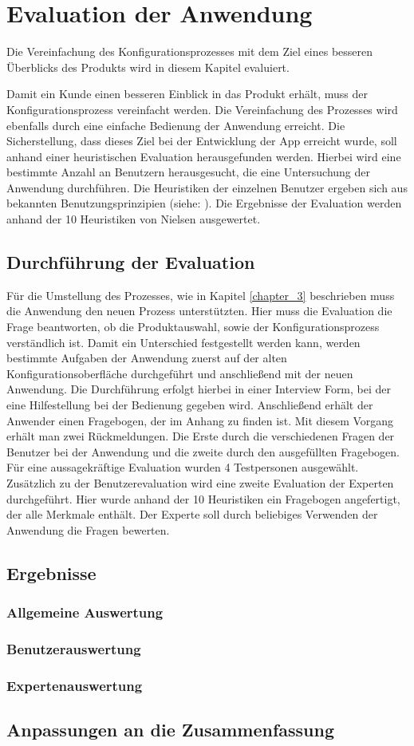 \chapter{Evaluation der Anwendung}\label{chapter_6}
Die Vereinfachung des Konfigurationsprozesses mit dem Ziel eines besseren Überblicks des Produkts wird in diesem Kapitel evaluiert. 


Damit ein Kunde einen besseren Einblick in das Produkt erhält, muss der Konfigurationsprozess vereinfacht werden. Die Vereinfachung des Prozesses wird ebenfalls durch eine einfache Bedienung der Anwendung erreicht. Die Sicherstellung, dass dieses Ziel bei der Entwicklung der App erreicht wurde, soll anhand einer heuristischen Evaluation herausgefunden werden. Hierbei wird eine bestimmte Anzahl an Benutzern herausgesucht, die eine Untersuchung der Anwendung durchführen. Die Heuristiken der einzelnen Benutzer ergeben sich aus bekannten Benutzungsprinzipien (siehe: \cite{bib:heuristik1}). Die Ergebnisse der Evaluation werden anhand der 10 Heuristiken von Nielsen \cite{bib:heuristik2} ausgewertet.


\section{Durchführung der Evaluation}
Für die Umstellung des Prozesses, wie in Kapitel \ref{chapter_3} beschrieben muss die Anwendung den neuen Prozess unterstützten. Hier muss die Evaluation die Frage beantworten, ob die Produktauswahl, sowie der Konfigurationsprozess verständlich ist. Damit ein Unterschied festgestellt werden kann, werden bestimmte Aufgaben der Anwendung zuerst auf der alten Konfigurationsoberfläche durchgeführt und anschließend mit der neuen Anwendung. Die Durchführung erfolgt hierbei in einer Interview Form, bei der eine Hilfestellung bei der Bedienung gegeben wird. Anschließend erhält der Anwender einen Fragebogen, der im Anhang zu finden ist. Mit diesem Vorgang erhält man zwei Rückmeldungen. Die Erste durch die verschiedenen Fragen der Benutzer bei der Anwendung und die zweite durch den ausgefüllten Fragebogen. Für eine aussagekräftige Evaluation wurden 4 Testpersonen ausgewählt. Zusätzlich zu der Benutzerevaluation wird eine zweite Evaluation der Experten durchgeführt. Hier wurde anhand der 10 Heuristiken ein Fragebogen angefertigt, der alle Merkmale enthält. Der Experte soll durch beliebiges Verwenden der Anwendung die Fragen bewerten. 


\section{Ergebnisse}

\subsection{Allgemeine Auswertung}
\subsection{Benutzerauswertung}
\subsection{Expertenauswertung}

\section{Anpassungen an die Zusammenfassung}